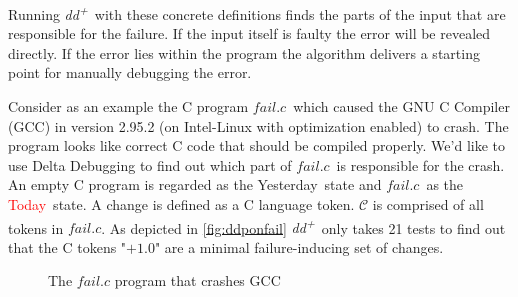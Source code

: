 \documentclass[a4paper,UKenglish]{lipics-v2018}
\newcommand{\ddp}{\textit{dd\textsuperscript{+}}}
\newcommand{\green}[1]{\textcolor{td-green}{#1}}
\newcommand{\red}[1]{\textcolor{red}{#1}}
\newcommand{\yd}[0]{\green{Yesterday}}
\newcommand{\td}[0]{\red{Today}}
\newcommand{\C}[0]{\ensuremath{\mathcal{C}}}
\newcommand{\reffail}[0]{\hyperref[fig:fail.c]{\ensuremath{fail.c}}}
\begin{document}
Running \ddp\ with these concrete definitions finds the parts of the input that are responsible for the failure. If the input itself is faulty the error will be revealed directly. If the error lies within the program the algorithm delivers a starting point for manually debugging the error.

Consider as an example the C program \reffail\ which caused the GNU C Compiler (GCC) in version 2.95.2 (on Intel-Linux with optimization enabled) to crash. The program looks like correct C code that should be compiled properly. We'd like to use Delta Debugging to find out which part of \reffail\ is responsible for the crash. An empty C program is regarded as the \yd\ state and \reffail\ as the \td\ state. A change is defined as a C language token. $\C$ is comprised of all tokens in \reffail. As depicted in \ref{fig:ddponfail} \ddp\ only takes 21 tests to find out that the C tokens "$+ 1.0$" are a minimal failure-inducing set of changes.
\\
\begin{figure}[h!]
	\caption{The $fail.c$ program that crashes GCC}
	\label{fig:fail.c}
\end{figure}
\\
\end{document}
